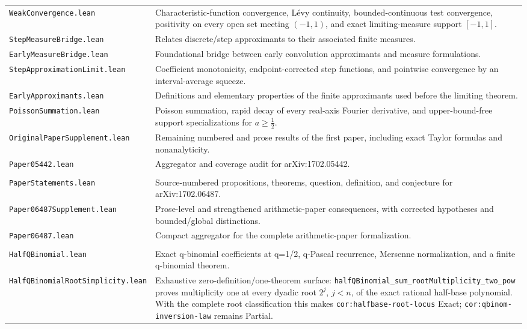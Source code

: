 \documentclass[11pt,oneside]{article}
\theoremstyle{definition}
\theoremstyle{remark}
\begin{document}
\begin{longtable}{>{\raggedright\arraybackslash}p{} >{\raggedright\arraybackslash}p{}}
\nolinkurl{WeakConvergence.lean} & Characteristic-function convergence, Lévy continuity, bounded-continuous test convergence, positivity on every open set meeting \((-1,1)\), and exact limiting-measure support \([-1,1]\). \\
\nolinkurl{StepMeasureBridge.lean} & Relates discrete/step approximants to their associated finite measures. \\
\nolinkurl{EarlyMeasureBridge.lean} & Foundational bridge between early convolution approximants and measure formulations. \\
\nolinkurl{StepApproximationLimit.lean} & Coefficient monotonicity, endpoint-corrected step functions, and pointwise convergence by an interval-average squeeze. \\
\nolinkurl{EarlyApproximants.lean} & Definitions and elementary properties of the finite approximants used before the limiting theorem. \\
\nolinkurl{PoissonSummation.lean} & Poisson summation, rapid decay of every real-axis Fourier derivative, and upper-bound-free support specializations for \(a\geq\tfrac12\). \\
\nolinkurl{OriginalPaperSupplement.lean} & Remaining numbered and prose results of the first paper, including exact Taylor formulas and nonanalyticity. \\
\nolinkurl{Paper05442.lean} & Aggregator and coverage audit for arXiv:1702.05442. \\
\addlinespace[0.45em]
\multicolumn{2}{l}{\textbf{The arithmetic paper}}\\[0.25em]
\nolinkurl{PaperStatements.lean} & Source-numbered propositions, theorems, question, definition, and conjecture for arXiv:1702.06487. \\
\nolinkurl{Paper06487Supplement.lean} & Prose-level and strengthened arithmetic-paper consequences, with corrected hypotheses and bounded/global distinctions. \\
\nolinkurl{Paper06487.lean} & Compact aggregator for the complete arithmetic-paper formalization. \\
\addlinespace[0.45em]
\multicolumn{2}{l}{\textbf{Finite q-binomial and Thue--Morse algebra}}\\[0.25em]
\nolinkurl{HalfQBinomial.lean} & Exact q-binomial coefficients at q=1/2, q-Pascal recurrence, Mersenne normalization, and a finite q-binomial theorem. \\
\nolinkurl{HalfQBinomialRootSimplicity.lean} & Exhaustive zero-definition/one-theorem surface: \nolinkurl{halfQBinomial_sum_rootMultiplicity_two_pow} proves multiplicity one at every dyadic root \(2^j\), \(j<n\), of the exact rational half-base polynomial.  With the complete root classification this makes \nolinkurl{cor:halfbase-root-locus} Exact; \nolinkurl{cor:qbinom-inversion-law} remains Partial. \\

\end{longtable}
\end{document}
